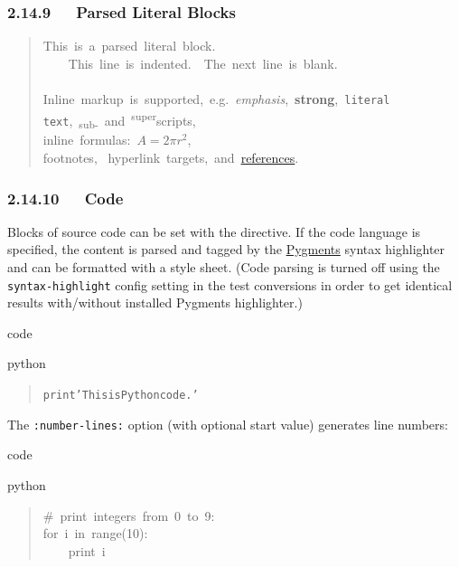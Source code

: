 \documentclass[a4paper]{article}
\begin{document}
\subsubsection{2.14.9   Parsed Literal Blocks%
  \label{parsed-literal-blocks}%
}

\begin{quote}
\ttfamily\raggedright
This~is~a~parsed~literal~block.\\
~~~~This~line~is~indented.~~The~next~line~is~blank.\\
~\\
Inline~markup~is~supported,~e.g.~\emph{emphasis},~\textbf{strong},~\texttt{literal\\
text},~\textsubscript{sub-}~and~\textsuperscript{super}scripts,\\
inline~formulas:~$A = 2 \pi r^2$,\\
footnotes,~%
\label{hyperlink-targets}hyperlink~targets,~and~\href{http://www.python.org/}{references}.
\end{quote}


\subsubsection{2.14.10   Code%
  \label{code}%
}

Blocks of source code can be set with the  directive. If the code
language is specified, the content is parsed and tagged by the \href{http://pygments.org/}{Pygments}
syntax highlighter and can be formatted with a style sheet. (Code parsing
is turned off using the \texttt{syntax-highlight} config setting in the test
conversions in order to get identical results with/without installed
Pygments highlighter.)

\begin{DUclass}{code}
\begin{DUclass}{python}
\begin{quote}
\begin{alltt}
print 'This is Python code.'
\end{alltt}
\end{quote}
\end{DUclass}
\end{DUclass}

The \texttt{:number-lines:} option (with optional start value) generates line
numbers:

\begin{DUclass}{code}
\begin{DUclass}{python}
\begin{quote}
\ttfamily\raggedright
{}\#~print~integers~from~0~to~9:\\
for~i~in~range(10):\\
~~~~print~i
\end{quote}
\end{DUclass}
\end{DUclass}
\end{document}
